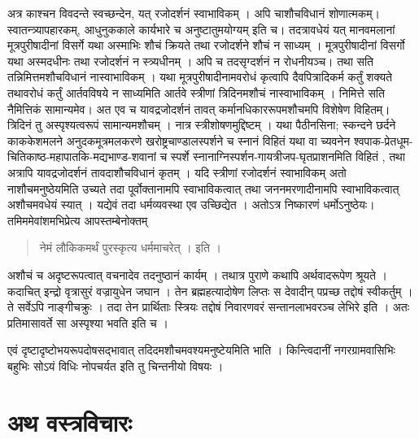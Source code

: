 अत्र काश्चन विवदन्ते स्वच्छन्देन, यत् रजोदर्शनं स्वाभाविकम् । अपि चाशौचविधानं शोणात्मकम्। स्वातन्त्र्यापहारकम्, आधुनुककाले कार्यभारे च अनुष्टातुमयोग्यम् इति च। तदत्रावधेयं यत् मानवमलानां मूत्रपुरीषादीनां विसर्गे यथा अस्माभिः शौचं क्रियते तथा रजोदर्शने शौचं न साध्यम् । मूत्रपुरीषादीनां विसर्गो यथा अस्मदधीनः तथा रजोदर्शनं न स्त्र्यधीनम् । अपि च तदसृग्दर्शनं न रोधनीयञ्च। तथा सति तन्निमित्तमशौचविधानं नास्वाभाविकम् । यथा मूत्रपुरीषादीनामवरोधं कृत्वापि दैवपित्रादिकर्म कर्तुं शक्यते तथावरोधं कर्तुं आर्तवविषये न साध्यमिति आर्तवे स्त्रीणां त्रिदिनमशौचं नास्वाभाविकम् । निमित्ते सति नैमित्तिकं सामान्यमेव। अत एव च यावद्रजोदर्शनं तावत् कर्मानधिकाररूपमशौचमपि विशेषेण विहितम्। त्रिदिनं तु अस्पृश्यत्वरूपं सामान्यमशौचम् । नात्र स्त्रीशोषणमुद्दिष्टम् । यथा पैठीनसिना; स्कन्दने छर्दने काककेशमलने अनुदकमूत्रमलकरणे खरोष्ट्रचाण्डालस्पर्शने च स्नानं विहितं यथा वा च्यवनेन श्वपाक-प्रेतधूम-चितिकाष्ठ-महापातकि-मद्यभाण्ड-शवानां च स्पर्शे स्नानाग्निस्पर्शन-गायत्रीजप-घृतप्राशनमिति विहितं , तथा अत्रापि यावद्रजोदर्शनं तावदाशौचविधानं कृतम् । यदि स्त्रीणां रजोदर्शनं स्वाभाविकम् अतो नाशौचमनुष्ठेयमिति उच्यते तदा पूर्वोक्तानामपि स्वाभाविकत्वात् तथा जननमरणादीनामपि स्वाभाविकत्वात् अशौचमवधेयं स्यात् । यद्येवं तदा धर्मव्यवस्था एव उच्छिद्येत । अतोऽत्र निष्कारणं धर्मोऽनुष्ठेयः। तमिममेवांशमभिप्रेत्य आपस्तम्बेनोक्तम् 
\begin{verse}
नेमं लौकिकमर्थं पुरस्कृत्य धर्ममाचरेत् । इति । 
\end{verse}
अशौचं च अदृष्टरूपत्वात् वचनादेव तदनुष्ठानं कार्यम् । तथात्र पुराणे कथापि अर्थवादरूपेण श्रूयते । कदाचित् इन्द्रो वृत्रासुरं वज्रायुधेन जघान । तेन ब्रह्महत्यादोषेण लिप्तः स देवादीन् पप्रच्छ तद्दोषं स्वीकर्तुम् । ते सर्वेऽपि नाङ्गीचक्रुः । तदा तेन प्रार्थिताः स्त्रियः तद्दोषं निवारणवरं सन्तानलाभवरञ्च लेभिरे इति । अतः प्रतिमासावर्ते सा अस्पृश्या भवति इति च । 

एवं दृष्टादृष्टोभयरूपदोषसद्भावात् तदिदमशौचमवश्यमनुष्टेयमिति भाति । किन्त्विदानीं नगरग्रामवासिभिः बहुभिः सोऽयं विधिः नोपचर्यत इति तु चिन्तनीयो विषयः ।

\section*{अथ वस्त्रविचारः}

